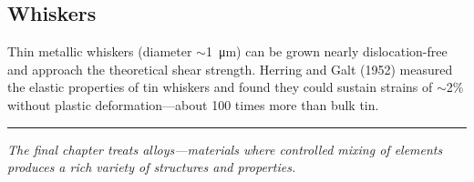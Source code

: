 \subsection{Whiskers}

Thin metallic whiskers (diameter $\sim$\SI{1}{\micro\metre}) can be grown nearly dislocation-free and approach the theoretical shear strength. Herring and Galt (1952) measured the elastic properties of tin whiskers and found they could sustain strains of $\sim$2\% without plastic deformation---about 100 times more than bulk tin.

\vspace{1cm}
\noindent\rule{\textwidth}{0.4pt}
\textit{The final chapter treats alloys---materials where controlled mixing of elements produces a rich variety of structures and properties.}

